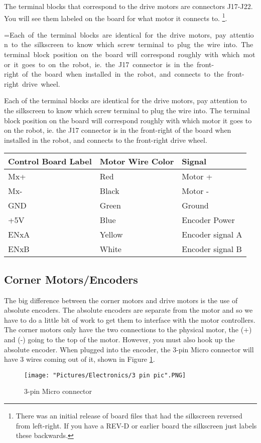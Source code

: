 \documentclass[12pt]{article}
\makeatletter
\newcommand{\mybox}[1]{%
  \setbox0=\hbox{#1}%
  \setlength{\@tempdima}{\dimexpr\wd0+13pt}%
  \begin{tcolorbox}[colframe=mycolor,boxrule=0.5pt,arc=4pt,
      left=6pt,right=6pt,top=6pt,bottom=6pt,boxsep=0pt,width=0.95\textwidth]
    #1
  \end{tcolorbox}
}
\makeatother
\begin{document}
The terminal blocks that correspond to the drive motors are connectors J17-J22. You will see them labeled on the board for what motor it connects to. \footnote{There was an initial release of board files that had the silkscreen reversed from left-right. If you have a REV-D or earlier board the silkscreen just labels these backwards.}.

\mybox{Each of the terminal blocks are identical for the drive motors, pay attention to the silkscreen to know which screw terminal to plug the wire into. The terminal block position on the board will correspond roughly with which motor it goes to on the robot, ie. the J17 connector is in the front-right of the board when installed in the robot, and connects to the front-right drive wheel. }

\begin{tabular}[3] {| l | l | l |}
	\hline
	\textbf{Control Board Label} & \textbf{Motor Wire Color} & \textbf{Signal} \\ \hline
	Mx+ & Red & Motor + \\ \hline
	Mx- & Black & Motor - \\ \hline
	GND & Green & Ground \\ \hline
	+5V & Blue & Encoder Power \\ \hline
	ENxA & Yellow & Encoder signal A \\ \hline
	ENxB & White & Encoder signal B \\ \hline
	\hline
\end{tabular}


\subsection{Corner Motors/Encoders}
The big difference between the corner motors and drive motors is the use of absolute encoders. The absolute encoders are separate from the motor and so we have to do a little bit of work to get them to interface with the motor controllers. The corner motors only have the two connections to the physical motor, the (+) and (-) going to the top of the motor. However, you must also hook up the absolute encoder. When plugged into the encoder, the 3-pin Micro connector will have 3 wires coming out of it, shown in Figure \ref{3pin}.

\bigskip 

\begin{figure}[H]
 	\centering
	\texttt{[image: "Pictures/Electronics/3 pin pic".PNG]}
 	\caption{3-pin Micro connector}
	\label{3pin}
\end{figure}
\end{document}
